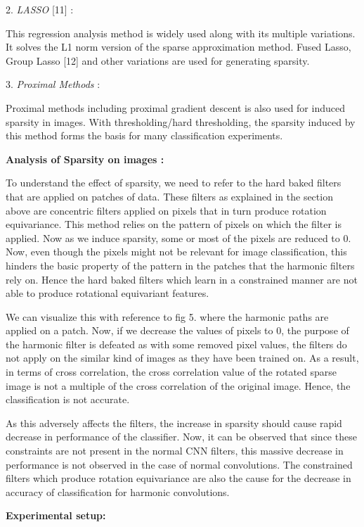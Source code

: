\documentclass{article}
\begin{document}
2.	\emph{ LASSO } [11] :

This regression analysis method is widely used along with its multiple variations. It solves the L1 norm version of the sparse approximation method. Fused Lasso, Group Lasso [12] and other variations are used for generating sparsity.

3.	\emph{Proximal Methods} :

Proximal methods including proximal gradient descent is also used for induced sparsity in images. With thresholding/hard thresholding, the sparsity induced by this method forms the basis for many classification experiments.

\textbf{Analysis of Sparsity on images :}

To understand the effect of sparsity, we need to refer to the hard baked filters that are applied on patches of data. These filters as explained in the section above are concentric filters applied on pixels that in turn produce rotation equivariance. This method relies on the pattern of pixels on which the filter is applied. Now as we induce sparsity, some or most of the pixels are reduced to 0. Now, even though the pixels might not be relevant for image classification, this hinders the basic property of the pattern in the patches that the harmonic filters rely on. Hence the hard baked filters which learn in a constrained manner are not able to produce rotational equivariant features. 

We can visualize this with reference to fig 5.  where the harmonic paths are applied on a patch. Now, if we decrease the values of pixels to 0, the purpose of the harmonic filter is defeated as with some removed pixel values, the filters do not apply on the similar kind of images as they have been trained on. As a result, in terms of cross correlation, the cross correlation value of the rotated sparse image is not a multiple of the cross correlation of the original image. Hence, the classification is not accurate. 

As this adversely affects the filters, the increase in sparsity should cause rapid decrease in performance of the classifier. Now, it can be observed that since these constraints are not present in the normal CNN filters, this massive decrease in performance is not observed in the case of normal convolutions. The constrained filters which produce rotation equivariance are also the cause for the decrease in accuracy of classification for harmonic convolutions.

\textbf{Experimental setup:}
 
\end{document}
